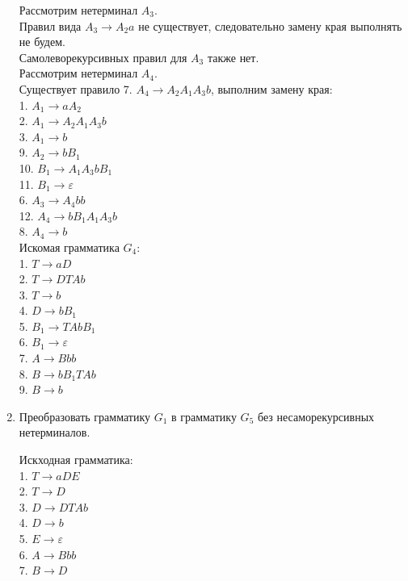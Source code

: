 \documentclass[a4paper,14pt]{extarticle}
\begin{document}
\begin{enumerate}[1.]
Рассмотрим нетерминал $A_3$.\\
Правил вида $A_3 \rightarrow A_2a$ не существует, 
следовательно замену края выполнять не будем.\\
Самолеворекурсивных правил для $A_3$ также нет.\\

Рассмотрим нетерминал $A_4$.\\
Существует правило 7. $A_4 \rightarrow A_2A_1A_3b$, выполним замену края:\\
1. $A_1 \rightarrow aA_2$\\
2. $A_1 \rightarrow A_2A_1A_3b$\\
3. $A_1 \rightarrow b$\\
9. $A_2 \rightarrow bB_1$\\
10. $B_1 \rightarrow A_1A_3bB_1$\\
11. $B_1 \rightarrow \varepsilon$\\
6. $A_3 \rightarrow A_4bb$\\
12. $A_4 \rightarrow bB_1A_1A_3b$\\
8. $A_4 \rightarrow b$\\

Искомая грамматика $G_4$: \\
1. $T \rightarrow aD$\\
2. $T \rightarrow DTAb$\\
3. $T \rightarrow b$\\
4. $D \rightarrow bB_1$\\
5. $B_1 \rightarrow TAbB_1$\\
6. $B_1 \rightarrow \varepsilon$\\
7. $A \rightarrow Bbb$\\
8. $B \rightarrow bB_1TAb$\\
9. $B \rightarrow b$\\

\iffalse
\item Преобразовать грамматику $G_1$ в грамматику $G_5$ без несаморекурсивных
нетерминалов.

Искходная грамматика:\\
1. $T \rightarrow aDE$\\
2. $T \rightarrow D$\\
3. $D \rightarrow DTAb$\\
4. $D \rightarrow b$\\
5. $E \rightarrow \varepsilon$\\
6. $A \rightarrow Bbb$\\
7. $B \rightarrow D$\\


\end{enumerate}
\end{document}
